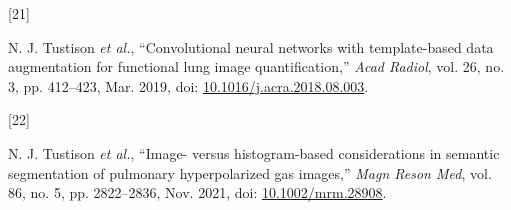 \documentclass[
  11pt,
]{article}
\newlength{\cslhangindent}
\newlength{\csllabelwidth}
\newenvironment{CSLReferences}[2] %
 {%
  \setlength{\parindent}{0pt}
  \ifodd #1 \everypar{\setlength{\hangindent}{\cslhangindent}}\ignorespaces\fi
  \ifnum #2 > 0
  \setlength{\parskip}{#2\baselineskip}
  \fi
 }%
 {}
\newcommand{\CSLLeftMargin}[1]{\parbox[t]{\csllabelwidth}{#1}}
\newcommand{\CSLRightInline}[1]{\parbox[t]{\linewidth - \csllabelwidth}{#1}\break}
\begin{document}
\begin{CSLReferences}{0}{0}
\leavevmode{}%
\CSLLeftMargin{{[}21{]} }
\CSLRightInline{N. J. Tustison \emph{et al.}, {``Convolutional neural
networks with template-based data augmentation for functional lung image
quantification,''} \emph{Acad Radiol}, vol. 26, no. 3, pp. 412--423,
Mar. 2019, doi:
\href{https://doi.org/10.1016/j.acra.2018.08.003}{10.1016/j.acra.2018.08.003}.}

\leavevmode{}%
\CSLLeftMargin{{[}22{]} }
\CSLRightInline{N. J. Tustison \emph{et al.}, {``Image- versus
histogram-based considerations in semantic segmentation of pulmonary
hyperpolarized gas images,''} \emph{Magn Reson Med}, vol. 86, no. 5, pp.
2822--2836, Nov. 2021, doi:
\href{https://doi.org/10.1002/mrm.28908}{10.1002/mrm.28908}.}

\end{CSLReferences}
\end{document}

